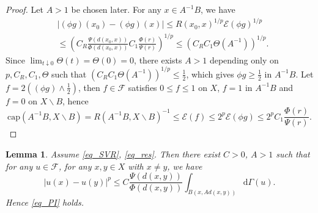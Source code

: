\documentclass[11pt,a4paper]{article}
\numberwithin{equation}{section}
\theoremstyle{plain}
\newtheorem{lemma}[theorem]{Lemma}
\theoremstyle{definition}
\begin{document}
\begin{proof}
Let $A>1$ be chosen later. For any $x\in A^{-1}B$, we have
\begin{align*}
&|(\phi g)(x_0)-(\phi g)(x)|\le R(x_0,x)^{1/p}\mathcal{E}(\phi g)^{1/p}\\
&\le \left(C_R \frac{\Psi(d(x_0,x))}{\Phi(d(x_0,x))}C_1 \frac{\Phi(r)}{\Psi(r)}\right)^{1/p}\le  \left(C_RC_1\Theta(A^{-1})\right)^{1/p}.
\end{align*}
Since $\lim_{t\downarrow0}\Theta(t)=\Theta(0)=0$, there exists $A>1$ depending only on $p, C_R, C_1, \Theta$ such that $\left(C_RC_1\Theta(A^{-1})\right)^{1/p}\le \frac{1}{2}$, which gives $\phi g\ge \frac{1}{2}$ in $A^{-1}B$. Let $f=2((\phi g)\wedge \frac{1}{2})$, then $f\in\mathcal{F}$ satisfies $0\le f\le 1$ on $X$, $f=1$ in $A^{-1}B$ and $f=0$ on $X\backslash B$, hence
$$\mathrm{cap}(A^{-1}B,X\backslash B)=R(A^{-1}B,X\backslash B)^{-1}\le\mathcal{E}(f)\le2^p\mathcal{E}(\phi g)\le 2^pC_1 \frac{\Phi(r)}{\Psi(r)}.$$
\end{proof}

\begin{lemma}\label{lem_R2PI}
Assume \ref{eq_SVR}, \ref{eq_res}. Then there exist $C>0$, $A>1$ such that for any $u\in\mathcal{F}$, for any $x,y\in X$ with $x\ne y$, we have
\begin{equation}\label{eq_R2PI}
|u(x)-u(y)|^p\le C \frac{\Psi(d(x,y))}{\Phi(d(x,y))}\int_{B(x,Ad(x,y))}\mathrm{d}\Gamma(u).
\end{equation}
Hence \ref{eq_PI} holds.
\end{lemma}
\end{document}
